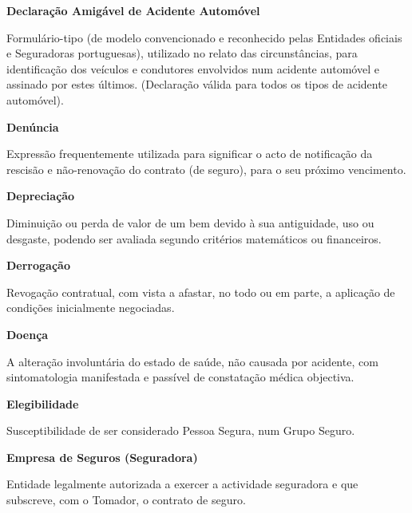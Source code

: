 \begin{description}
\item \textbf{Declaração Amigável de Acidente Automóvel}

Formulário-tipo (de modelo convencionado e reconhecido pelas Entidades oficiais e Seguradoras portuguesas), utilizado no relato das circunstâncias, para identificação dos veículos e condutores envolvidos num acidente automóvel e assinado por estes últimos. (Declaração válida para todos os tipos de acidente automóvel).
\end{description}

\begin{description}
\item \textbf{Denúncia}

Expressão frequentemente utilizada para significar o acto de notificação da rescisão e não-renovação do contrato (de seguro), para o seu próximo vencimento.
\end{description}

\begin{description}
\item \textbf{Depreciação}

Diminuição ou perda de valor de um bem devido à sua antiguidade, uso ou desgaste, podendo ser avaliada segundo critérios matemáticos ou financeiros.
\end{description}

\begin{description}
\item \textbf{Derrogação}

Revogação contratual, com vista a afastar, no todo ou em parte, a aplicação de condições inicialmente negociadas.
\end{description}

\begin{description}
\item \textbf{Doença}

A alteração involuntária do estado de saúde, não causada por acidente, com sintomatologia manifestada e passível de constatação médica objectiva.
\end{description}

\begin{description}
\item \textbf{Elegibilidade}

Susceptibilidade de ser considerado Pessoa Segura, num Grupo Seguro.
\end{description}

\begin{description}
\item \textbf{Empresa de Seguros (Seguradora)}

Entidade legalmente autorizada a exercer a actividade seguradora e que subscreve, com o Tomador, o contrato de seguro.
\end{description}


